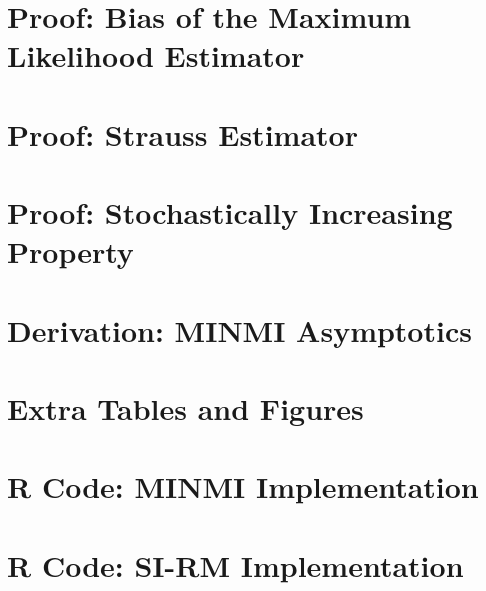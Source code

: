 \documentclass[honours,12pt]{UNSWthesis}
\begin{document}
\appendix

\chapter{Proof: Bias of the Maximum Likelihood Estimator}\label{apx:mle-bias-proof}


\chapter{Proof: Strauss Estimator}\label{apx:strauss-estimator-proof}


\chapter{Proof: Stochastically Increasing Property}\label{apx:minmi-stoch-incr-proof}


\chapter{Derivation: MINMI Asymptotics}\label{apx:minmi-asymptotics-proof}


\chapter{Extra Tables and Figures}\label{apx:extra-tables-figures}


\chapter{R Code: MINMI Implementation}\label{apx:code-minmi}


\chapter{R Code: SI-RM Implementation}\label{apx:code-si-rm}



\end{document}
